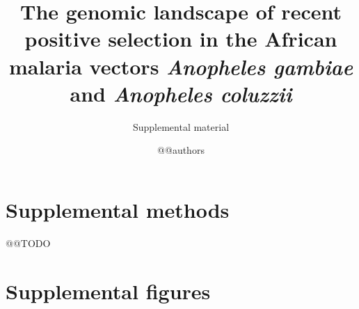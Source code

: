 \documentclass[a4paper,11pt,abstracton,hidelinks]{scrartcl}
\title{
The genomic landscape of recent positive selection in the African malaria vectors \textit{Anopheles gambiae} and \textit{Anopheles coluzzii}
}
\subtitle{\large{Supplemental material}}
\author{@@authors}
\begin{document}
\maketitle

\beginsupplement

\clearpage


\section*{Supplemental methods}

@@TODO


\clearpage


\section*{Supplemental figures}
\end{document}
